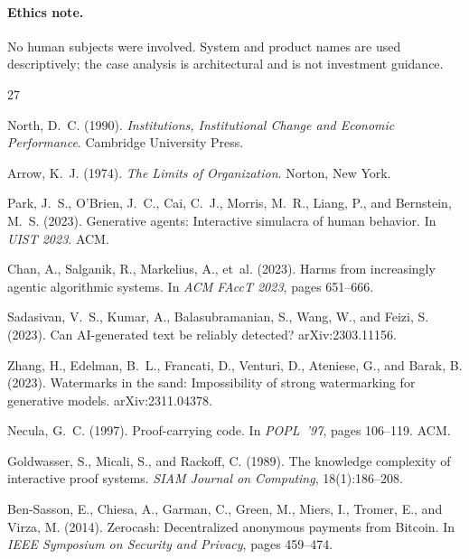 \documentclass[11pt]{article}
\begin{document}
\paragraph*{Ethics note.}
No human subjects were involved. System and product names are used
descriptively; the case analysis is architectural and is not investment
guidance.

\begin{thebibliography}{27}
\small\setlength{\itemsep}{2pt}

North, D.~C. (1990). \emph{Institutions, Institutional Change and
Economic Performance}. Cambridge University Press.

Arrow, K.~J. (1974). \emph{The Limits of Organization}. Norton, New York.

Park, J.~S., O'Brien, J.~C., Cai, C.~J., Morris, M.~R., Liang, P., and
Bernstein, M.~S. (2023). Generative agents: Interactive simulacra of
human behavior. In \emph{UIST 2023}. ACM.

Chan, A., Salganik, R., Markelius, A., et~al. (2023). Harms from
increasingly agentic algorithmic systems. In \emph{ACM FAccT 2023},
pages 651--666.

Sadasivan, V.~S., Kumar, A., Balasubramanian, S., Wang, W., and Feizi, S.
(2023). Can {AI}-generated text be reliably detected? arXiv:2303.11156.

Zhang, H., Edelman, B.~L., Francati, D., Venturi, D., Ateniese, G., and
Barak, B. (2023). Watermarks in the sand: Impossibility of strong
watermarking for generative models. arXiv:2311.04378.

Necula, G.~C. (1997). Proof-carrying code. In \emph{POPL~'97}, pages
106--119. ACM.

Goldwasser, S., Micali, S., and Rackoff, C. (1989). The knowledge
complexity of interactive proof systems. \emph{SIAM Journal on
Computing}, 18(1):186--208.

Ben-Sasson, E., Chiesa, A., Garman, C., Green, M., Miers, I., Tromer, E.,
and Virza, M. (2014). Zerocash: Decentralized anonymous payments from
{Bitcoin}. In \emph{IEEE Symposium on Security and Privacy}, pages
459--474.


\end{thebibliography}
\end{document}
